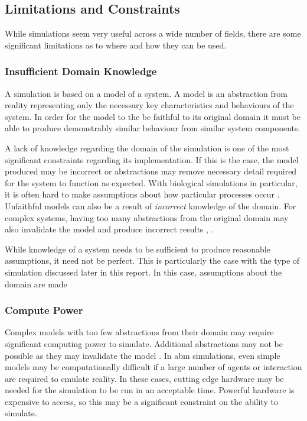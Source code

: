 \documentclass{UoYCSproject}
\begin{document}
\subsection{Limitations and Constraints}
While simulations seem very useful across a wide number of fields, there are some significant limitations as to where and how they can be used.

\subsubsection{Insufficient Domain Knowledge}
\label{domain_knowledge}
A simulation is based on a model of a system.
A model is an abstraction from reality representing only the necessary key characteristics and behaviours of the system.
In order for the model to the be faithful to its original domain it must be able to produce demonstrably similar behaviour from similar system components.

A lack of knowledge regarding the domain of the simulation is one of the most significant constraints regarding its implementation.
If this is the case, the model produced may be incorrect or abstractions may remove necessary detail required for the system to function as expected.
With biological simulations in particular, it is often hard to make assumptions about how particular processes occur \cite{stepney_abm}.
Unfaithful models can also be a result of \textit{incorrect} knowledge of the domain.
For complex systems, having too many abstractions from the original domain may also invalidate the model and produce incorrect results \cite[p.8]{cosmos}, \cite{stepney_abm}.

While knowledge of a system needs to be sufficient to produce reasonable assumptions, it need not be perfect.
This is particularly the case with the type of simulation discussed later in this report.
In this case, assumptions about the domain are made %

\subsubsection{Compute Power}
Complex models with too few abstractions from their domain may require significant computing power to simulate.
Additional abstractions may not be possible as they may invalidate the model \cite{stepney_abm}.
In \gls{abm} simulations, even simple models may be computationally difficult if a large number of agents or interaction are required to emulate reality.
In these cases, cutting edge hardware may be needed for the simulation to be run in an acceptable time.
Powerful hardware is expensive to access, so this may be a significant constraint on the ability to simulate.
\end{document}
